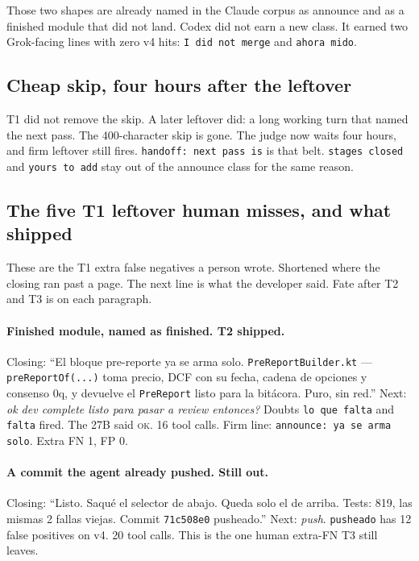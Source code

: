 Those two shapes are already named in the Claude corpus as announce
and as a finished module that did not land. Codex did not earn a new
class. It earned two Grok-facing lines with zero v4 hits:
\texttt{I did not merge} and \texttt{ahora mido}.

\subsection{Cheap skip, four hours after the leftover}
\label{app:cheap2}

T1 did not remove the skip. A later leftover did: a long working turn
that named the next pass. The 400-character skip is gone. The judge
now waits four hours, and firm leftover still fires.
\texttt{handoff: next pass is} is that belt.
\texttt{stages closed} and \texttt{yours to add} stay out of the
announce class for the same reason.

\subsection{The five T1 leftover human misses, and what shipped}
\label{app:remainfull}

These are the T1 extra false negatives a person wrote. Shortened
where the closing ran past a page. The next line is what the
developer said. Fate after T2 and T3 is on each paragraph.

\paragraph{Finished module, named as finished. T2 shipped.}
Closing: ``El bloque pre-reporte ya se arma solo.
\texttt{PreReportBuilder.kt} --- \texttt{preReportOf(...)} toma
precio, DCF con su fecha, cadena de opciones y consenso 0q, y
devuelve el \texttt{PreReport} listo para la bit\'acora. Puro, sin
red.''
Next: \emph{ok dev complete listo para pasar a review entonces?}
Doubts \texttt{lo que falta} and \texttt{falta} fired. The 27B said
\textsc{ok}. 16 tool calls. Firm line: \texttt{announce: ya se arma
solo}. Extra FN 1, FP 0.

\paragraph{A commit the agent already pushed. Still out.}
Closing: ``Listo. Saqu\'e el selector de abajo. Queda solo el de
arriba. Tests: 819, las mismas 2 fallas viejas. Commit
\texttt{71c508e0} pusheado.''
Next: \emph{push}.
\texttt{pusheado} has 12 false positives on v4. 20 tool calls. This
is the one human extra-FN T3 still leaves.

